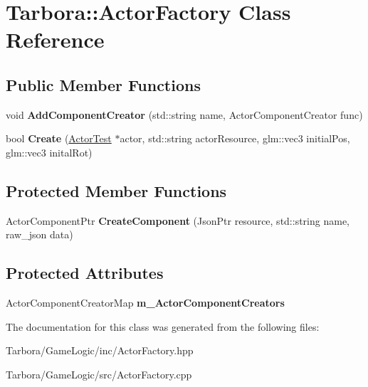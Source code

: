 \hypertarget{classTarbora_1_1ActorFactory}{}\section{Tarbora\+:\+:Actor\+Factory Class Reference}
\label{classTarbora_1_1ActorFactory}
\subsection*{Public Member Functions}
\begin{DoxyCompactItemize}
\item 
\mbox{\label{classTarbora_1_1ActorFactory_ac74d6cbd05cc1cd9859baa3c10d08222}} 
void {\bfseries Add\+Component\+Creator} (std\+::string name, Actor\+Component\+Creator func)
\item 
\mbox{\label{classTarbora_1_1ActorFactory_a2868cc8c4d2a3ea100507e8734084106}} 
bool {\bfseries Create} (\hyperlink{classTarbora_1_1ActorTest}{Actor\+Test} $\ast$actor, std\+::string actor\+Resource, glm\+::vec3 initial\+Pos, glm\+::vec3 inital\+Rot)
\end{DoxyCompactItemize}
\subsection*{Protected Member Functions}
\begin{DoxyCompactItemize}
\item 
\mbox{\label{classTarbora_1_1ActorFactory_a8716aaffe784609b317b5f30e5724d85}} 
Actor\+Component\+Ptr {\bfseries Create\+Component} (Json\+Ptr resource, std\+::string name, raw\+\_\+json data)
\end{DoxyCompactItemize}
\subsection*{Protected Attributes}
\begin{DoxyCompactItemize}
\item 
\mbox{\label{classTarbora_1_1ActorFactory_afdd824e4b59a45312f5edda0de93cf97}} 
Actor\+Component\+Creator\+Map {\bfseries m\+\_\+\+Actor\+Component\+Creators}
\end{DoxyCompactItemize}


The documentation for this class was generated from the following files\+:\begin{DoxyCompactItemize}
\item 
Tarbora/\+Game\+Logic/inc/Actor\+Factory.\+hpp\item 
Tarbora/\+Game\+Logic/src/Actor\+Factory.\+cpp\end{DoxyCompactItemize}
